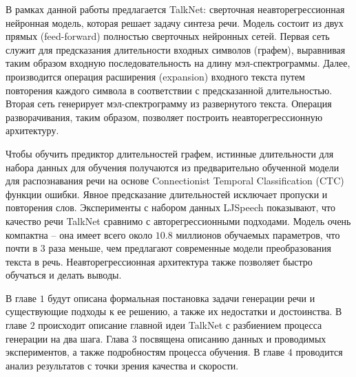В рамках данной работы предлагается TalkNet: сверточная неавторегрессионная нейронная модель, которая решает задачу синтеза речи. Модель состоит из двух прямых (feed-forward) полностью сверточных нейронных сетей. Первая сеть служит для предсказания длительности входных символов (графем), выравнивая таким образом входную последовательность на длину мэл-спектрограммы. Далее, производится операция расширения (expansion) входного текста путем повторения каждого символа в соответствии с предсказанной длительностью. Вторая сеть генерирует мэл-спектрограмму из развернутого текста. Операция разворачивания, таким образом, позволяет построить неавторегрессионную архитектуру.

Чтобы обучить предиктор длительностей графем, истинные длительности для набора данных для обучения получаются из предварительно обученной модели для распознавания речи на основе Connectionist Temporal Classification (CTC) функции ошибки. Явное предсказание длительностей исключает пропуски и повторения слов. Эксперименты с набором данных LJSpeech показывают, что качество речи TalkNet сравнимо с авторегрессионными подходами. Модель очень компактна -- она имеет всего около $10.8$ миллионов обучаемых параметров, что почти в 3 раза меньше, чем предлагают современные модели преобразования текста в речь. Неавторегрессионная архитектура также позволяет быстро обучаться и делать выводы.

В главе $1$ будут описана формальная постановка задачи генерации речи и существующие подходы к ее решению, а также их недостатки и достоинства. В главе $2$ происходит описание главной идеи TalkNet с разбиением процесса генерации на два шага. Глава $3$ посвящена описанию данных и проводимых экспериментов, а также подробностям процесса обучения. В главе $4$ проводится анализ результатов с точки зрения качества и скорости.